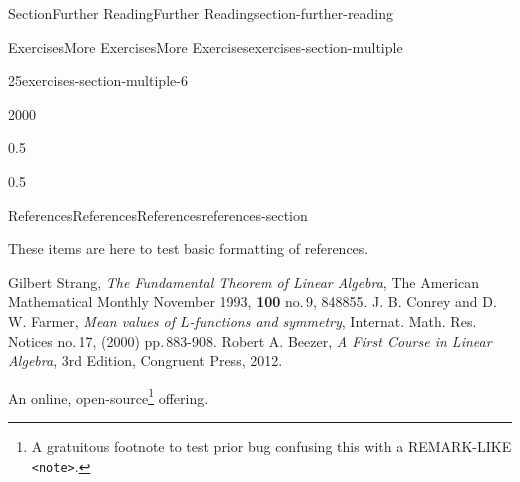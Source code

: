 \documentclass[twoside,10pt,]{article}
\newcommand{\tabularfont}{\relax}
\newcommand{\mono}[1]{\texttt{#1}}
\numberwithin{equation}{section}
\newcommand{\hrulemedium}{\noalign{\hrule height 0.07em}}
\begin{document}
\begin{sectionptx}{Section}{Further Reading}{}{Further Reading}{}{}{section-further-reading}
\begin{exercises-subsection}{Exercises}{More Exercises}{}{More Exercises}{}{}{exercises-section-multiple}
\begin{divisionexercise}{25}{}{}{exercises-section-multiple-6}
\begin{sidebyside}{2}{0}{0}{0}
\begin{sbspanel}{0.5}%
\noindent\resizebox{\ifdim\width > \linewidth\linewidth\else\width\fi}{!}{%
{\centering%
{\tabularfont%
\begin{tabular}{cc}
{\bfseries{}\(x\)}&{\bfseries{}\(f(x)\)}\tabularnewline\hrulemedium
\(0\)&\(0\)\tabularnewline[0pt]
\(1\)&\(1\)\tabularnewline[0pt]
\(2\)&\(4\)\tabularnewline[0pt]
\(3\)&\(9\)
\end{tabular}
}%
\par}
}%
\end{sbspanel}%
\begin{sbspanel}{0.5}%
\noindent{}%
\end{sbspanel}%
\end{sidebyside}%
\end{divisionexercise}%
\end{exercises-subsection}
%
%
\typeout{************************************************}
\typeout{************************************************}
%
\begin{references-subsection}{References}{References}{}{References}{}{}{references-section}
%
\begin{introduction}{}%
These items are here to test basic formatting of references.%
\end{introduction}%
\begin{referencelist}
\hypertarget{biblio-strang-article}{}Gilbert Strang, \textit{The Fundamental Theorem of Linear Algebra}, The American Mathematical Monthly November 1993, \textbf{100} no.\@\,9, 848\textendash{}855.
\hypertarget{CF}{}J. B. Conrey and D. W. Farmer, \textit{Mean values of \(L\)-functions and symmetry}, Internat. Math. Res. Notices no.\@\,17, (2000) pp.\@\,883-908.
\hypertarget{biblio-beezer-fcla}{}Robert A. Beezer, \textit{A First Course in Linear Algebra}, 3rd Edition, Congruent Press, 2012. \par%
An online, open-source\footnote{A gratuitous footnote to test prior bug confusing this with a REMARK-LIKE \mono{<note>}.\label{biblio-beezer-fcla-2-1-1}} offering.%


\end{referencelist}
\end{references-subsection}
\end{sectionptx}
\end{document}
